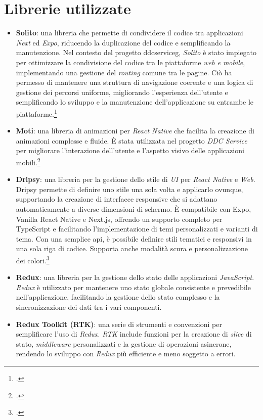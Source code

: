 \section{Librerie utilizzate}
\begin{itemize}
    \item \textbf{Solito}: una libreria che permette di condividere il codice tra applicazioni \textit{Next} ed \textit{Expo}, riducendo la duplicazione del codice e semplificando la manutenzione.
    Nel contesto del progetto \gls{ddcserviceg}\glox, \textit{Solito} è stato impiegato per ottimizzare la condivisione del codice tra le piattaforme \textit{web e mobile}, implementando una gestione del \textit{routing} comune tra le pagine.
    Ciò ha permesso di mantenere una struttura di navigazione coerente e una logica di gestione dei percorsi uniforme, migliorando l'esperienza dell'utente e semplificando lo sviluppo e la manutenzione dell'applicazione su entrambe le piattaforme.\footcite{site:solito}
    \item \textbf{Moti}: una libreria di animazioni per \textit{React Native} che facilita la creazione di animazioni complesse e fluide.
    È stata utilizzata nel progetto \textit{DDC Service} per migliorare l'interazione dell'utente e l'aspetto visivo delle applicazioni mobili.\footcite{site:moti}
    \item \textbf{Dripsy}: una libreria per la gestione dello stile di \textit{UI} per \textit{React Native} e \textit{Web}.
    Dripsy permette di definire uno stile una sola volta e applicarlo ovunque, supportando la creazione di interfacce responsive che si adattano automaticamente a diverse dimensioni di schermo. È compatibile con Expo, Vanilla React Native e Next.js, offrendo un supporto completo per TypeScript e facilitando l'implementazione di temi personalizzati e varianti di tema. Con una semplice \gls{api}\glox, è possibile definire stili tematici e responsivi in una sola riga di codice. Supporta anche modalità scura e personalizzazione dei colori.\footcite{site:dripsy}
    \item \textbf{Redux}: una libreria per la gestione dello stato delle applicazioni \textit{JavaScript}.
    \textit{Redux} è utilizzato per mantenere uno stato globale consistente e prevedibile nell'applicazione, facilitando la gestione dello stato complesso e la sincronizzazione dei dati tra i vari componenti.
    \item \textbf{Redux Toolkit (RTK)}: una serie di strumenti e convenzioni per semplificare l'uso di \textit{Redux}. \textit{RTK} include funzioni per la creazione di \textit{slice} di stato, \textit{middleware} personalizzati e la gestione di operazioni asincrone, rendendo lo sviluppo con \textit{Redux} più efficiente e meno soggetto a errori.

\end{itemize}

